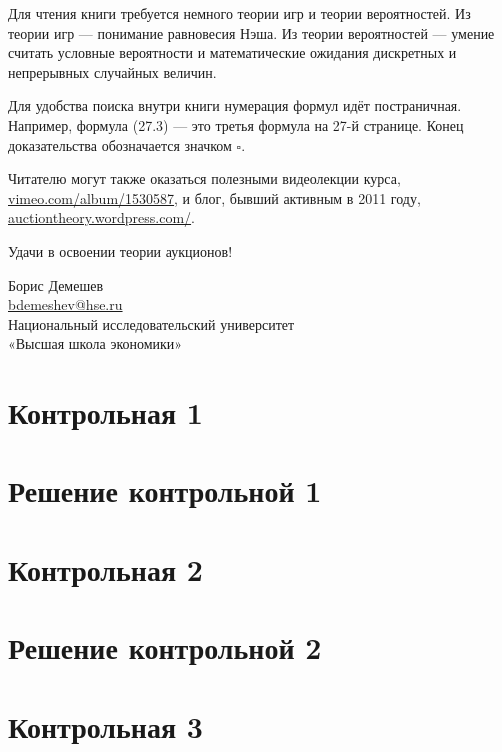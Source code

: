 \documentclass[11pt, openany]{book}
\numberwithin{equation}{page} %
\theoremstyle{definition} %
\theoremstyle{definition}
\theoremstyle{definition}
\begin{document}
Для чтения книги требуется немного теории игр и теории вероятностей. Из теории игр — понимание равновесия Нэша. Из теории вероятностей — умение считать условные вероятности и математические ожидания дискретных и непрерывных случайных величин.

Для удобства поиска внутри книги нумерация формул идёт постраничная. Например, формула (27.3) — это третья формула на 27-й странице. Конец доказательства обозначается значком $\square$.

Читателю могут также оказаться полезными видеолекции курса, \url{vimeo.com/album/1530587}, и блог, бывший активным в 2011 году, \url{auctiontheory.wordpress.com/}.

Удачи в освоении теории аукционов!

\begin{flushright}
  Борис Демешев \\
  \href{mailto:bdemeshev@hse.ru}{bdemeshev@hse.ru} \\
  Национальный исследовательский университет\\
  «Высшая школа экономики»
\end{flushright}




\section{Контрольная 1}



\section{Решение контрольной 1}






\section{Контрольная 2}



\section{Решение контрольной 2}





\section{Контрольная 3}
\end{document}
